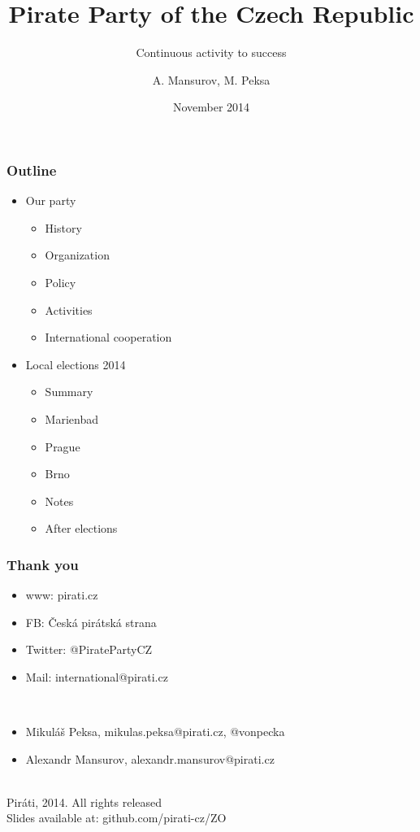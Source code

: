 \documentclass[sans]{beamer}
\begin{document}
	\title{Pirate Party of the Czech Republic}
	\subtitle{Continuous activity to success}
	\author{A. Mansurov, M. Peksa}
	\date{November 2014}
	
	\frame{\titlepage}
	\begin{frame}
		\frametitle{Outline}
		\begin{itemize}
			\item Our party
				\begin{itemize}
					\item History
					\item Organization
					\item Policy
					\item Activities
					\item International cooperation
				\end{itemize}
			\item Local elections 2014
				\begin{itemize}
					\item Summary
					\item Marienbad
					\item Prague
					\item Brno
					\item Notes
					\item After elections
				\end{itemize}
		\end{itemize}
	\end{frame}
	
	
	\begin{frame}
		\frametitle{Thank you}
		\begin{itemize}
		\item www: pirati.cz
		\item FB: \v{C}esk\'a pir\'atsk\'a strana
		\item Twitter: @PiratePartyCZ
		\item Mail: international@pirati.cz
		\end{itemize}
		~\\
		\begin{itemize}
		\item Mikul\'a\v{s} Peksa, mikulas.peksa@pirati.cz, @vonpecka
		\item Alexandr Mansurov, alexandr.mansurov@pirati.cz
		\end{itemize}
		~\\
		\textcopyleft Pir\'ati, 2014. All rights released\\
		Slides available at: github.com/pirati-cz/ZO
	\end{frame}
\end{document}
